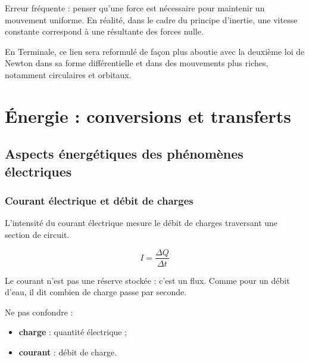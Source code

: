 \documentclass[11pt,a4paper]{article}
\begin{document}
\begin{attentionbox}
Erreur fréquente : penser qu'une force est nécessaire pour maintenir un mouvement uniforme.  
En réalité, dans le cadre du principe d'inertie, une vitesse constante correspond à une résultante des forces nulle.
\end{attentionbox}

\begin{terminalebox}
En Terminale, ce lien sera reformulé de façon plus aboutie avec la deuxième loi de Newton dans sa forme différentielle et dans des mouvements plus riches, notamment circulaires et orbitaux.
\end{terminalebox}

\newpage

\section{Énergie : conversions et transferts}

\subsection{Aspects énergétiques des phénomènes électriques}

\subsubsection{Courant électrique et débit de charges}

\begin{definitionbox}
L'intensité du courant électrique mesure le débit de charges traversant une section de circuit.
\end{definitionbox}

\begin{proprbox}
\[
I=\frac{\Delta Q}{\Delta t}
\]
\end{proprbox}

\begin{sensbox}
Le courant n'est pas une réserve stockée : c'est un flux.  
Comme pour un débit d'eau, il dit combien de charge passe par seconde.
\end{sensbox}

\begin{attentionbox}
Ne pas confondre :
\begin{itemize}
    \item \textbf{charge} : quantité électrique ;
    \item \textbf{courant} : débit de charge.
\end{itemize}
\end{attentionbox}
\end{document}
